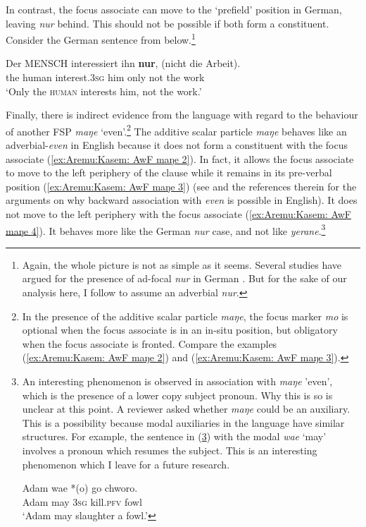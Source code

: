 \documentclass[output=paper,colorlinks,citecolor=brown,draftmode
]{langscibook}
\begin{document}
\z


In contrast, the focus associate can move to the `prefield' position in German, leaving \textit{nur} behind. This should not be possible if both form a constituent. Consider the German sentence from \cite[196]{Mursell2021ISagreement} \citep[citing][43]{jacobs1983fokus} below.\footnote{Again, the whole picture is not as simple as it seems. Several studies have argued for the presence of ad-focal \textit{nur} in German \citep[see][a.o.]{reis2005syntax, meyer2009pragmatic, hole2015distributed}. But for the sake of our analysis here, I follow \citet{buring2001syntax} to assume an adverbial \textit{nur}.}

\ea \label{ex:Aremu:German: focus fronting without nur}

\gll Der MENSCH interessiert ihn \textbf{nur}, (nicht die Arbeit).\\
   the human interest.3\textsc{sg} him only not the work\\
\glt `Only the \textsc{human} interests him, not the work.'

\z

Finally, there is indirect evidence from the language with regard to the behaviour of another FSP \textit{maŋe} `even'.\footnote{In the presence of the additive scalar particle \textit{maŋe}, the focus marker \textit{mo} is optional when the focus associate is in an in-situ position, but obligatory when the focus associate is fronted. Compare the examples (\ref{ex:Aremu:Kasem: AwF maŋe 2}) and (\ref{ex:Aremu:Kasem: AwF maŋe 3}).} The additive scalar particle \textit{maŋe} behaves like an adverbial-\textit{even} in English because it does not form a constituent with the focus associate (\ref{ex:Aremu:Kasem: AwF maŋe 2}). In fact, it allows the focus associate to move to the left periphery of the clause while it remains in its pre-verbal position (\ref{ex:Aremu:Kasem: AwF maŋe 3}) (see \citet{erlewine2014a} and the references therein for the arguments on why backward association with \textit{even} is possible in English). It does not move to the left periphery with the focus associate (\ref{ex:Aremu:Kasem: AwF maŋe 4}). It behaves more like the German \textit{nur} case, and not like \textit{yerane}.\footnote{An interesting phenomenon is observed in association with \textit{maŋe} 'even', which is the presence of a lower copy subject pronoun. Why this is so is unclear at this point. A reviewer asked whether \textit{maŋe} could be an auxiliary. This is a possibility because modal auxiliaries in the language have similar structures. For example, the sentence in (\ref{ex:Aremu:modal}) with the modal \textit{wae} `may' involves a pronoun which resumes the subject. This is an interesting phenomenon which I leave for a future research.

\ea	 \label{ex:Aremu:modal}
\gll Adam wae *(o) go chworo.\\
	Adam may 3\textsc{sg} kill.\textsc{pfv} fowl\\
\glt `Adam may slaughter a fowl.'
\z
}
\end{document}
